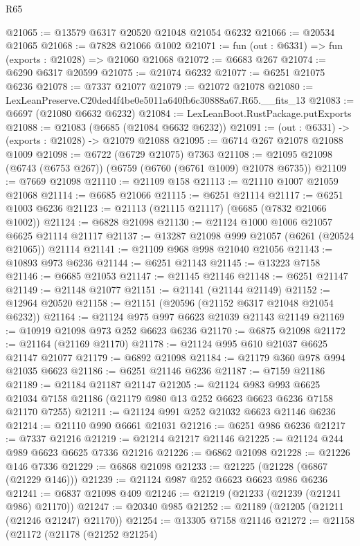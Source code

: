 \begin{lexlean}{R65}
\begin{coremodule}
{@21065 := @13579 @6317 @20520 @21048 @21054 @6232
@21066 := @20534 @21065
@21068 := @7828 @21066 @1002
@21071 := fun (out : @6331) => fun (exports : @21028) => @21060 @21068
@21072 := @6683 @267
@21074 := @6290 @6317 @20599
@21075 := @21074 @6232
@21077 := @6251 @21075 @6236
@21078 := @7337 @21077
@21079 := @21072 @21078
@21080 := LexLeanPreserve.C20ded4f4be0e5011a640fb6c30888a67.R65.__fits_13
@21083 := @6697 (@21080 @6632 @6232)
@21084 := LexLeanBoot.RustPackage.putExports
@21088 := @21083 (@6685 (@21084 @6632 @6232))
@21091 := (out : @6331) -> (exports : @21028) -> @21079 @21088
@21095 := @6714 @267 @21078 @21088 @1009
@21098 := @6722 (@6729 @21075) @7363
@21108 := @21095 @21098 (@6743 (@6753 @267)) (@6759 (@6760 (@6761 @1009) @21078 @6735))
@21109 := @7669 @21098
@21110 := @21109 @158
@21113 := @21110 @1007 @21059 @21068
@21114 := @6685 @21066
@21115 := @6251 @21114
@21117 := @6251 @1003 @6236
@21123 := @21113 (@21115 @21117) (@6685 (@7832 @21066 @1002))
@21124 := @6828 @21098
@21130 := @21124 @1000 @1006 @21057 @6625 @21114 @21117
@21137 := @13287 @21098 @999 @21057 (@6261 (@20524 @21065)) @21114
@21141 := @21109 @968 @998 @21040 @21056
@21143 := @10893 @973 @6236
@21144 := @6251 @21143
@21145 := @13223 @7158
@21146 := @6685 @21053
@21147 := @21145 @21146
@21148 := @6251 @21147
@21149 := @21148 @21077
@21151 := @21141 (@21144 @21149)
@21152 := @12964 @20520
@21158 := @21151 (@20596 (@21152 @6317 @21048 @21054 @6232))
@21164 := @21124 @975 @997 @6623 @21039 @21143 @21149
@21169 := @10919 @21098 @973 @252 @6623 @6236
@21170 := @6875 @21098
@21172 := @21164 (@21169 @21170)
@21178 := @21124 @995 @610 @21037 @6625 @21147 @21077
@21179 := @6892 @21098
@21184 := @21179 @360 @978 @994 @21035 @6623
@21186 := @6251 @21146 @6236
@21187 := @7159 @21186
@21189 := @21184 @21187 @21147
@21205 := @21124
    @983
    @993
    @6625
    @21034
    @7158
    @21186
    (@21179 @980 @13 @252 @6623 @6623 @6236 @7158 @21170 @7255)
@21211 := @21124 @991 @252 @21032 @6623 @21146 @6236
@21214 := @21110 @990 @6661 @21031
@21216 := @6251 @986 @6236
@21217 := @7337 @21216
@21219 := @21214 @21217 @21146
@21225 := @21124 @244 @989 @6623 @6625 @7336 @21216
@21226 := @6862 @21098
@21228 := @21226 @146 @7336
@21229 := @6868 @21098
@21233 := @21225 (@21228 (@6867 (@21229 @146)))
@21239 := @21124 @987 @252 @6623 @6623 @986 @6236
@21241 := @6837 @21098 @409
@21246 := @21219 (@21233 (@21239 (@21241 @986) @21170))
@21247 := @20340 @985
@21252 := @21189 (@21205 (@21211 (@21246 @21247) @21170))
@21254 := @13305 @7158 @21146
@21272 := @21158
    (@21172
      (@21178
        (@21252 @21254)
}
\end{coremodule}
\end{lexlean}
